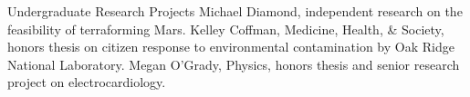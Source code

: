 %
%
\begin{rubric}{Undergraduate Research Projects}
\entry*[2012]Michael Diamond, independent research on the feasibility of terraforming Mars.
\entry*[2008--2009]Kelley Coffman, Medicine, Health, \& Society, honors thesis on citizen response to environmental contamination by Oak Ridge National Laboratory.
\entry*[2002--2003]Megan O'Grady, Physics, honors thesis and senior research project on electrocardiology.
\end{rubric}